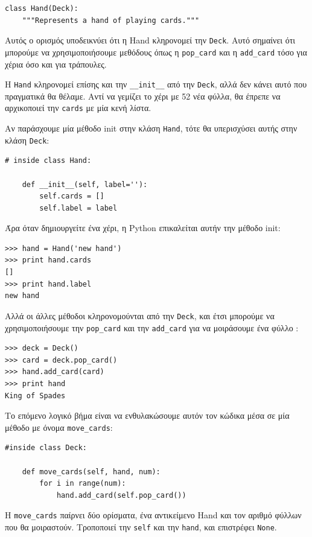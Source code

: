 \documentclass[10pt]{book}
\begin{document}
\begin{verbatim}
class Hand(Deck):
    """Represents a hand of playing cards."""
\end{verbatim}
%
 Αυτός ο ορισμός υποδεικνύει ότι η  Hand  κληρονομεί την  {\tt Deck}.   
Αυτό σημαίνει ότι μπορούμε να χρησιμοποιήσουμε μεθόδους όπως η  \verb"pop_card"   και η  \verb"add_card"  τόσο για χέρια όσο και για τράπουλες.

Η  {\tt Hand}  κληρονομεί επίσης και την  \verb"__init__"  από την  {\tt Deck},  αλλά δεν κάνει αυτό που πραγματικά θα θέλαμε.  Αντί να γεμίζει το χέρι με 52 
νέα φύλλα, θα έπρεπε να αρχικοποιεί την  {\tt cards}  με μία κενή λίστα.

Αν παράσχουμε μία μέθοδο  init  στην κλάση  {\tt Hand},  τότε θα υπερισχύσει 
αυτής στην κλάση  {\tt Deck}:

\begin{verbatim}
# inside class Hand:

    def __init__(self, label=''):
        self.cards = []
        self.label = label
\end{verbatim}
%
 Άρα όταν δημιουργείτε ένα χέρι, η  Python  επικαλείται αυτήν την μέθοδο  init:

\begin{verbatim}
>>> hand = Hand('new hand')
>>> print hand.cards
[]
>>> print hand.label
new hand
\end{verbatim}
%
 Αλλά οι άλλες μέθοδοι κληρονομούνται από την  {\tt Deck},  και έτσι μπορούμε 
να χρησιμοποιήσουμε την  \verb"pop_card"  και την  \verb"add_card"  για να μοιράσουμε ένα φύλλο :

\begin{verbatim}
>>> deck = Deck()
>>> card = deck.pop_card()
>>> hand.add_card(card)
>>> print hand
King of Spades
\end{verbatim}
%
 Το επόμενο λογικό βήμα είναι να ενθυλακώσουμε αυτόν τον κώδικα μέσα σε μία μέθοδο 
με όνομα  \verb"move_cards":

\begin{verbatim}
#inside class Deck:

    def move_cards(self, hand, num):
        for i in range(num):
            hand.add_card(self.pop_card())
\end{verbatim}
%
 Η  \verb"move_cards"  παίρνει δύο ορίσματα, ένα αντικείμενο  Hand  
και τον αριθμό φύλλων που θα μοιραστούν.  Τροποποιεί την  {\tt self}  και την 
 {\tt hand},  και επιστρέφει  {\tt None}.
\end{document}
